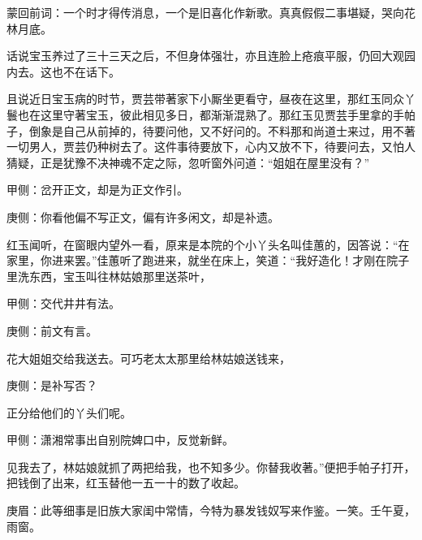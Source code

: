 

\begin{parag}
    \begin{note}蒙回前词：一个时才得传消息，一个是旧喜化作新歌。真真假假二事堪疑，哭向花林月底。\end{note}
\end{parag}


\begin{parag}
    话说宝玉养过了三十三天之后，不但身体强壮，亦且连脸上疮痕平服，仍回大观园内去。这也不在话下。
\end{parag}


\begin{parag}
    且说近日宝玉病的时节，贾芸带著家下小厮坐更看守，昼夜在这里，那红玉同众丫鬟也在这里守著宝玉，彼此相见多日，都渐渐混熟了。那红玉见贾芸手里拿的手帕子，倒象是自己从前掉的，待要问他，又不好问的。不料那和尚道士来过，用不著一切男人，贾芸仍种树去了。这件事待要放下，心内又放不下，待要问去，又怕人猜疑，正是犹豫不决神魂不定之际，忽听窗外问道：“姐姐在屋里没有？”\begin{note}甲侧：岔开正文，却是为正文作引。\end{note}\begin{note}庚侧：你看他偏不写正文，偏有许多闲文，却是补遗。\end{note}红玉闻听，在窗眼内望外一看，原来是本院的个小丫头名叫佳蕙的，因答说：“在家里，你进来罢。”佳蕙听了跑进来，就坐在床上，笑道：“我好造化！才刚在院子里洗东西，宝玉叫往林姑娘那里送茶叶，\begin{note}甲侧：交代井井有法。\end{note}\begin{note}庚侧：前文有言。\end{note}花大姐姐交给我送去。可巧老太太那里给林姑娘送钱来，\begin{note}庚侧：是补写否？\end{note}正分给他们的丫头们呢。\begin{note}甲侧：潇湘常事出自别院婢口中，反觉新鲜。\end{note}见我去了，林姑娘就抓了两把给我，也不知多少。你替我收著。”便把手帕子打开，把钱倒了出来，红玉替他一五一十的数了收起。\begin{note}庚眉：此等细事是旧族大家闺中常情，今特为暴发钱奴写来作鉴。一笑。壬午夏，雨窗。\end{note}
\end{parag}


